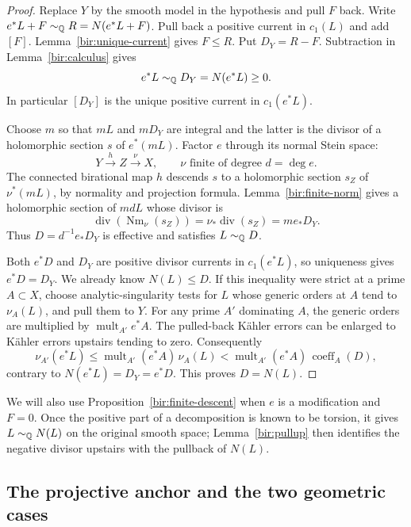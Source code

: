 \begin{proof}
Replace \(Y\) by the smooth model in the hypothesis and pull \(F\) back.
Write \(e^*L+F\sim_{\mathbb Q}R=N(e^*L+F)\). Pull back a positive current in
\(c_1(L)\) and add \([F]\). Lemma~\ref{bir:unique-current} gives
\(F\leq R\). Put \(D_Y=R-F\). Subtraction in
Lemma~\ref{bir:calculus} gives
\[
 e^*L\sim_{\mathbb Q}D_Y=N(e^*L)\geq0.
\]
In particular \([D_Y]\) is the unique positive current in \(c_1(e^*L)\).

Choose \(m\) so that \(mL\) and \(mD_Y\) are integral and the latter is
the divisor of a holomorphic section \(s\) of \(e^*(mL)\). Factor \(e\)
through its normal Stein space:
\[
 Y\xrightarrow{h}Z\xrightarrow{\nu}X,
 \qquad \nu\text{ finite of degree }d=\deg e.
\]
The connected birational map \(h\) descends \(s\) to a holomorphic
section \(s_Z\) of \(\nu^*(mL)\), by normality and projection formula.
Lemma~\ref{bir:finite-norm} gives a holomorphic section of \(mdL\) whose
divisor is
\[
 \operatorname{div}(\operatorname{Nm}_\nu(s_Z))
   =\nu_*\operatorname{div}(s_Z)=m e_*D_Y.
\]
Thus \(D=d^{-1}e_*D_Y\) is effective and satisfies \(L\sim_{\mathbb Q}D\).

Both \(e^*D\) and \(D_Y\) are positive divisor currents in
\(c_1(e^*L)\), so uniqueness gives \(e^*D=D_Y\). We already know
\(N(L)\leq D\). If this inequality were strict at a prime \(A\subset X\),
choose analytic-singularity tests for \(L\) whose generic orders at \(A\)
tend to \(\nu_A(L)\), and pull them to \(Y\). For any prime \(A'\)
dominating \(A\), the generic orders are multiplied by
\(\operatorname{mult}_{A'}e^*A\). The pulled-back Kähler errors can be
enlarged to Kähler errors upstairs tending to zero. Consequently
\[
 \nu_{A'}(e^*L)
 \leq \operatorname{mult}_{A'}(e^*A)\,\nu_A(L)
 <\operatorname{mult}_{A'}(e^*A)\,\operatorname{coeff}_A(D),
\]
contrary to \(N(e^*L)=D_Y=e^*D\). This proves \(D=N(L)\).
\end{proof}

We will also use Proposition~\ref{bir:finite-descent} when \(e\) is a
modification and \(F=0\). Once the positive part of a decomposition is
known to be torsion, it gives \(L\sim_{\mathbb Q}N(L)\) on the original smooth
space; Lemma~\ref{bir:pullup} then identifies the negative divisor upstairs
with the pullback of \(N(L)\).

\subsection{The projective anchor and the two geometric cases}

